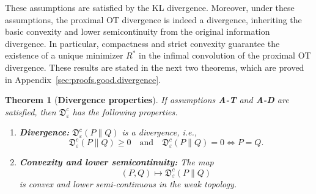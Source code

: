\documentclass{amsart}
\newtheorem{theorem}{Theorem}[section]
\theoremstyle{definition}
\theoremstyle{remark}
\numberwithin{equation}{section}
\begin{document}
\smallskip

These assumptions are satisfied by  the KL divergence.  Moreover, under these assumptions, the proximal OT divergence is indeed a divergence, inheriting the basic convexity and lower semicontinuity from the original information divergence. In particular, compactness and strict convexity guarantee the existence of a unique minimizer $R^*$ in the infimal convolution of the proximal OT divergence. These results are stated in the next two theorems, which are proved in Appendix~\ref{sec:proofs.good.divergence}. 

\begin{theorem}[\bf Divergence properties]\label{thm:divergence}
If assumptions {\bf A-T} and {\bf A-D} are satisfied, then $\mathfrak{D}^c_\varepsilon$ has the following properties. 
\begin{enumerate}
\item{\bf Divergence:} %
$\mathfrak{D}^{c}_{\varepsilon}(P\|Q)$ is a divergence, i.e., 
\begin{equation}\label{eq:divergence}
\mathfrak{D}^c_{\varepsilon}(P\|Q)   \ge 0 \quad \text{and}  \quad \mathfrak{D}^c_{\varepsilon}(P\|Q)=0 \iff P=Q. 
\end{equation}
\item{\bf Convexity and lower semicontinuity:} The map 
\begin{equation}
(P,Q) \mapsto \mathfrak{D}^c_\varepsilon(P\|Q)
\end{equation}
is convex and lower semi-continuous in the weak topology.  
\end{enumerate}
\end{theorem}


\end{document}
